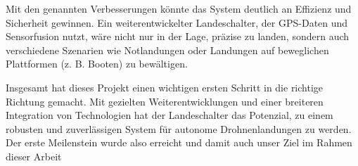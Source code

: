 Mit den genannten Verbesserungen könnte das System deutlich an Effizienz und Sicherheit gewinnen. Ein weiterentwickelter Landeschalter, der GPS-Daten und Sensorfusion nutzt, wäre nicht nur in der Lage, präzise zu landen, sondern auch verschiedene Szenarien wie Notlandungen oder Landungen auf beweglichen Plattformen (z. B. Booten) zu bewältigen. 

Insgesamt hat dieses Projekt einen wichtigen ersten Schritt in die richtige Richtung gemacht. Mit gezielten Weiterentwicklungen und einer breiteren Integration von Technologien hat der Landeschalter das Potenzial, zu einem robusten und zuverlässigen System für autonome Drohnenlandungen zu werden. Der erste Meilenstein wurde also erreicht und damit auch unser Ziel im Rahmen dieser Arbeit

